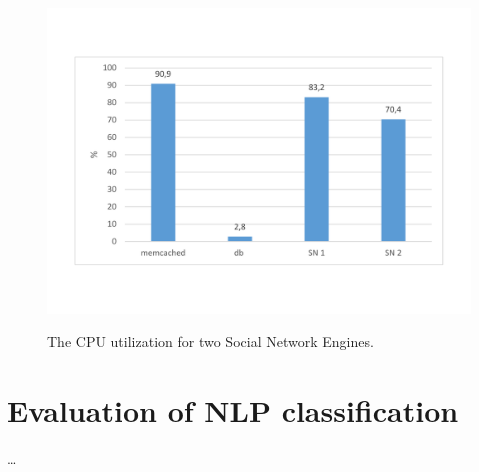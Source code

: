 \begin{figure}[h]
	\caption{The CPU utilization for two Social Network Engines.}
	\includegraphics[width=1\textwidth,natwidth=200,natheight=150]{./fig/Usage2SN.pdf}
	\centering
	\label{fig:cpu2SNavg}
\end{figure}

\section{Evaluation of NLP classification}
\label{sec:nlp_evaluation}
\ldots